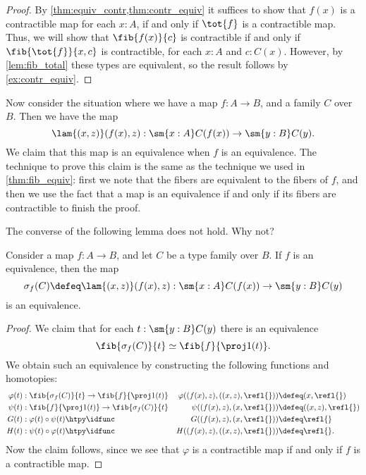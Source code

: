 \begin{proof}
By \cref{thm:equiv_contr,thm:contr_equiv} it suffices to show that $f(x)$ is a contractible map for each $x:A$, if and only if $\tot{f}$ is a contractible map. Thus, we will show that $\fib{f(x)}{c}$ is contractible if and only if $\fib{\tot{f}}{x,c}$ is contractible, for each $x:A$ and $c:C(x)$. However, by \cref{lem:fib_total} these types are equivalent, so the result follows by \cref{ex:contr_equiv}.
\end{proof}

Now consider the situation where we have a map $f:A\to B$, and a family $C$ over $B$. Then we have the map
\begin{equation*}
  \lam{(x,z)}(f(x),z):\sm{x:A}C(f(x))\to\sm{y:B}C(y).
\end{equation*}
We claim that this map is an equivalence when $f$ is an equivalence. The technique to prove this claim is the same as the technique we used in \cref{thm:fib_equiv}: first we note that the fibers are equivalent to the fibers of $f$, and then we use the fact that a map is an equivalence if and only if its fibers are contractible to finish the proof.

The converse of the following lemma does not hold. Why not?

\begin{lem}\label{lem:total-equiv-base-equiv}
  Consider a map $f:A\to B$, and let $C$ be a type family over $B$. If $f$ is an equivalence, then the map
  \begin{equation*}
    \sigma_f(C) \defeq\lam{(x,z)}(f(x),z):\sm{x:A}C(f(x))\to\sm{y:B}C(y)
  \end{equation*}
  is an equivalence.
\end{lem}

\begin{proof}
  We claim that for each $t:\sm{y:B}C(y)$ there is an equivalence
  \begin{equation*}
    \fib{\sigma_f(C)}{t}\simeq \fib{f}{\proj 1(t)}.
  \end{equation*}
  We obtain such an equivalence by constructing the following functions and homotopies:
  \begin{align*}
    \varphi(t) & : \fib{\sigma_f(C)}{t}\to\fib{f}{\proj 1 (t)} & \varphi((f(x),z),((x,z),\refl{})) & \defeq (x,\refl{}) \\
    \psi(t) & : \fib{f}{\proj 1(t)} \to\fib{\sigma_f(C)}{t} & \psi((f(x),z),(x,\refl{})) & \defeq ((x,z),\refl{}) \\
    G(t) & : \varphi(t)\circ\psi(t)\htpy\idfunc & G((f(x),z),(x,\refl{})) & \defeq \refl{} \\
    H(t) & : \psi(t)\circ\varphi(t)\htpy\idfunc & H((f(x),z),((x,z),\refl{})) & \defeq \refl{}.
  \end{align*}
  Now the claim follows, since we see that $\varphi$ is a contractible map if and only if $f$ is a contractible map.
\end{proof}

